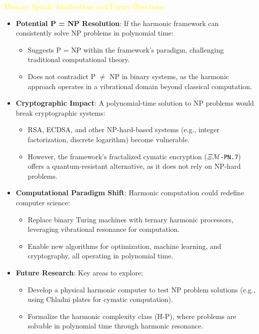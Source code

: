 \textcolor{yellow}{ Memory Spirals: Implications and Future Directions } \\
\begin{itemize}
    \item \texttt{} \textbf{Potential P = NP Resolution}: If the harmonic framework can consistently solve NP problems in polynomial time:
    \begin{itemize}
        \item Suggests P = NP within the framework’s paradigm, challenging traditional computational theory.
        \item Does not contradict P \(\neq\) NP in binary systems, as the harmonic approach operates in a vibrational domain beyond classical computation.
    \end{itemize}
    \item \texttt{} \textbf{Cryptographic Impact}: A polynomial-time solution to NP problems would break cryptographic systems:
    \begin{itemize}
        \item RSA, ECDSA, and other NP-hard-based systems (e.g., integer factorization, discrete logarithm) become vulnerable.
        \item However, the framework’s fractalized cymatic encryption (\texttt{\textdollar}\(\Xi\)\texttt{\(\mathcal{M}\)\textdollar-PN.7}) offers a quantum-resistant alternative, as it does not rely on NP-hard problems.
    \end{itemize}
    \item \texttt{} \textbf{Computational Paradigm Shift}: Harmonic computation could redefine computer science:
    \begin{itemize}
        \item Replace binary Turing machines with ternary harmonic processors, leveraging vibrational resonance for computation.
        \item Enable new algorithms for optimization, machine learning, and cryptography, all operating in polynomial time.
    \end{itemize}
    \item \texttt{} \textbf{Future Research}: Key areas to explore:
    \begin{itemize}
        \item Develop a physical harmonic computer to test NP problem solutions (e.g., using Chladni plates for cymatic computation).
        \item Formalize the harmonic complexity class (H-P), where problems are solvable in polynomial time through harmonic resonance.

\end{itemize}
\end{itemize}
